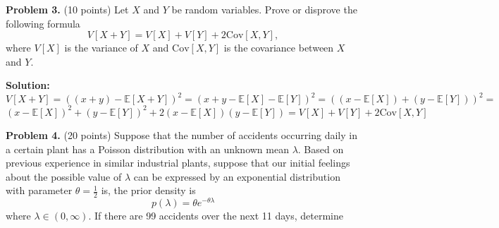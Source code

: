 \documentclass[twoside]{article}
\begin{document}

\textbf{Problem 3.} (10 points) Let $X$ and $Y$ be random variables. Prove or disprove the following formula
\[
V[X+Y]=V[X]+V[Y]+2\textrm{Cov}[X,Y],
\]
where $V[X]$ is the variance of $X$ and $\textrm{Cov}[X,Y]$ is the covariance between $X$ and $Y$.


\textbf{Solution:}
\[
V[X+Y] = ( (x+y) - \mathbb{E}[X+Y])^2 = (x+y - \mathbb{E}[X] - \mathbb{E}[Y])^2 = ( (x - \mathbb{E}[X]) + (y - \mathbb{E}[Y]) )^2 = 
\]
\[
(x-\mathbb{E}[X])^2 + (y-\mathbb{E}[Y])^2 + 2(x-\mathbb{E}[X])(y-\mathbb{E}[Y]) = V[X] + V[Y] + 2\textrm{Cov}[X,Y]
\]



\textbf{Problem 4.} (20 points) Suppose that the number of accidents occurring daily in a certain plant has a Poisson distribution with an unknown mean $\lambda$. Based on previous experience in similar industrial plants, suppose that our initial feelings about the possible value of $\lambda$ can be expressed by an exponential distribution with parameter $\theta = \frac{1}{2}$ is, the prior density is
\[
p(\lambda) = \theta e ^ {-\theta \lambda}
\]
where $\lambda \in (0, \infty)$. If there are 99 accidents over the next 11 days, determine
\end{document}
